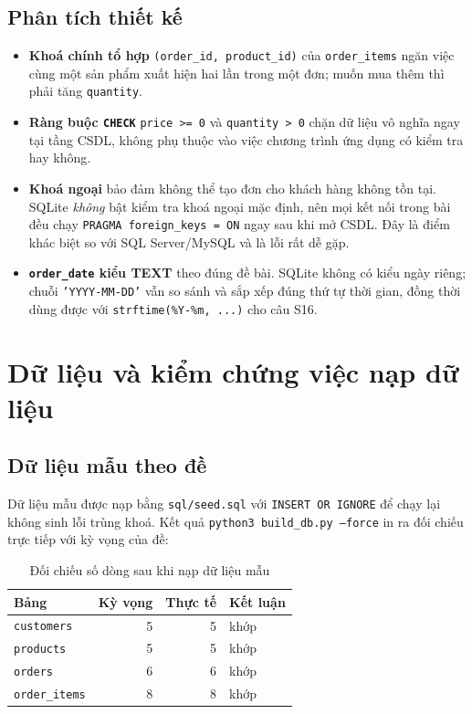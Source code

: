 \documentclass[12pt,a4paper]{article}
\newcommand{\code}[1]{\texttt{\small #1}}
\begin{document}
\subsection{Phân tích thiết kế}

\begin{itemize}[leftmargin=1.2cm,itemsep=2pt]
  \item \textbf{Khoá chính tổ hợp} \code{(order\_id, product\_id)} của \code{order\_items} ngăn
        việc cùng một sản phẩm xuất hiện hai lần trong một đơn; muốn mua thêm thì phải tăng
        \code{quantity}.
  \item \textbf{Ràng buộc \code{CHECK}} \code{price >= 0} và \code{quantity > 0} chặn dữ liệu vô
        nghĩa ngay tại tầng CSDL, không phụ thuộc vào việc chương trình ứng dụng có kiểm tra hay
        không.
  \item \textbf{Khoá ngoại} bảo đảm không thể tạo đơn cho khách hàng không tồn tại. SQLite
        \emph{không} bật kiểm tra khoá ngoại mặc định, nên mọi kết nối trong bài đều chạy
        \code{PRAGMA foreign\_keys = ON} ngay sau khi mở CSDL. Đây là điểm khác biệt so với
        SQL Server/MySQL và là lỗi rất dễ gặp.
  \item \textbf{\code{order\_date} kiểu TEXT} theo đúng đề bài. SQLite không có kiểu ngày riêng;
        chuỗi \code{'YYYY-MM-DD'} vẫn so sánh và sắp xếp đúng thứ tự thời gian, đồng thời dùng
        được với \code{strftime(\%Y-\%m, ...)} cho câu S16.
\end{itemize}

\section{Dữ liệu và kiểm chứng việc nạp dữ liệu}

\subsection{Dữ liệu mẫu theo đề}

Dữ liệu mẫu được nạp bằng \code{sql/seed.sql} với \code{INSERT OR IGNORE} để chạy lại không sinh
lỗi trùng khoá. Kết quả \code{python3 build\_db.py --force} in ra đối chiếu trực tiếp với kỳ vọng
của đề:

\begin{table}[H]
\centering
\caption{Đối chiếu số dòng sau khi nạp dữ liệu mẫu}
\label{tab:counts}
\small
\begin{tabular}{@{}l r r l@{}}
\toprule
\textbf{Bảng} & \textbf{Kỳ vọng} & \textbf{Thực tế} & \textbf{Kết luận} \\
\midrule
\code{customers}   & 5 & 5 & khớp \\
\code{products}    & 5 & 5 & khớp \\
\code{orders}      & 6 & 6 & khớp \\
\code{order\_items}& 8 & 8 & khớp \\
\bottomrule
\end{tabular}
\end{table}
\end{document}
